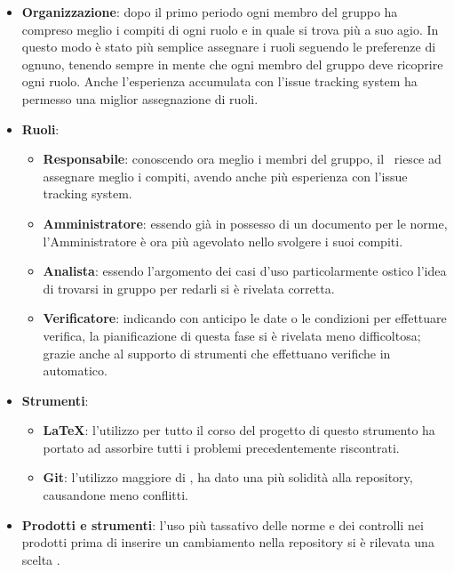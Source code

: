     \begin{itemize}
        \item \textbf{Organizzazione}: dopo il primo periodo ogni membro del gruppo ha compreso meglio i compiti di ogni ruolo e in quale si trova più a suo agio. In questo modo è stato più semplice assegnare i ruoli seguendo le preferenze di ognuno, tenendo sempre in mente che ogni membro del gruppo deve ricoprire ogni ruolo. Anche l'esperienza accumulata con l'issue tracking system ha permesso una miglior assegnazione di ruoli.
        \item \textbf{Ruoli}:
            \begin{itemize}
                \item \textbf{Responsabile}: conoscendo ora meglio i membri del gruppo, il \Res\ riesce ad assegnare meglio i compiti, avendo anche più esperienza con l'issue tracking system.
                \item \textbf{Amministratore}: essendo già in possesso di un documento per le norme, l'Amministratore è ora più agevolato nello svolgere i suoi compiti.
                \item \textbf{Analista}: essendo l'argomento dei casi d'uso particolarmente ostico l'idea di trovarsi in gruppo per redarli si è rivelata corretta.
                \item \textbf{Verificatore}: indicando con anticipo le date o le condizioni per effettuare verifica, la pianificazione di questa fase si è rivelata meno difficoltosa; grazie anche al supporto di strumenti che effettuano verifiche in automatico.
            \end{itemize}
        \item \textbf{Strumenti}:
            \begin{itemize}
                \item \textbf{\LaTeX}: l'utilizzo per tutto il corso del progetto di questo strumento ha portato ad assorbire tutti i problemi precedentemente riscontrati.
                \item \textbf{Git}: l'utilizzo maggiore di , ha dato una più solidità alla repository, causandone meno conflitti.
            \end{itemize}
        \item \textbf{Prodotti e strumenti}: l'uso più tassativo delle norme e dei controlli nei prodotti prima di inserire un cambiamento nella repository si è rilevata una scelta .
    \end{itemize}
    
